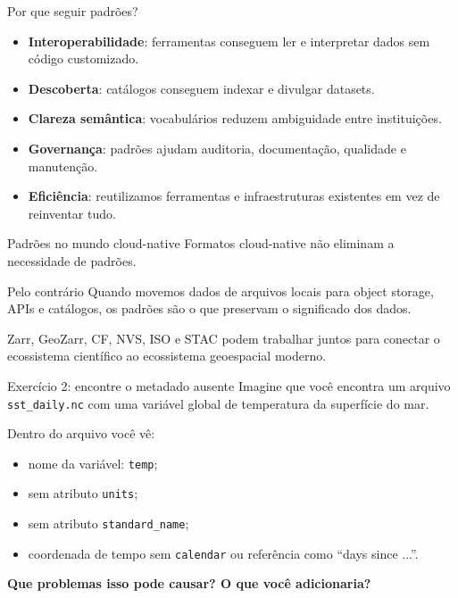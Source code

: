 \documentclass[aspectratio=169]{beamer}
\begin{document}
\begin{frame}{Por que seguir padrões?}
\begin{itemize}
  \item \textbf{Interoperabilidade}: ferramentas conseguem ler e interpretar dados sem código customizado.
  \item \textbf{Descoberta}: catálogos conseguem indexar e divulgar datasets.
  \item \textbf{Clareza semântica}: vocabulários reduzem ambiguidade entre instituições.
  \item \textbf{Governança}: padrões ajudam auditoria, documentação, qualidade e manutenção.
  \item \textbf{Eficiência}: reutilizamos ferramentas e infraestruturas existentes em vez de reinventar tudo.
\end{itemize}
\end{frame}

\begin{frame}{Padrões no mundo cloud-native}
\Large
Formatos cloud-native não eliminam a necessidade de padrões.

\vspace{0.4cm}

\begin{block}{Pelo contrário}
Quando movemos dados de arquivos locais para object storage, APIs e catálogos, os padrões são o que preservam o significado dos dados.
\end{block}

\vspace{0.4cm}

Zarr, GeoZarr, CF, NVS, ISO e STAC podem trabalhar juntos para conectar o ecossistema científico ao ecossistema geoespacial moderno.
\end{frame}

\begin{frame}{Exercício 2: encontre o metadado ausente}
Imagine que você encontra um arquivo \texttt{sst\_daily.nc} com uma variável global de temperatura da superfície do mar.

\vspace{0.3cm}

Dentro do arquivo você vê:

\begin{itemize}
  \item nome da variável: \texttt{temp};
  \item sem atributo \texttt{units};
  \item sem atributo \texttt{standard\_name};
  \item coordenada de tempo sem \texttt{calendar} ou referência como ``days since ...''.
\end{itemize}

\vspace{0.3cm}

\textbf{Que problemas isso pode causar? O que você adicionaria?}
\end{frame}
\end{document}
